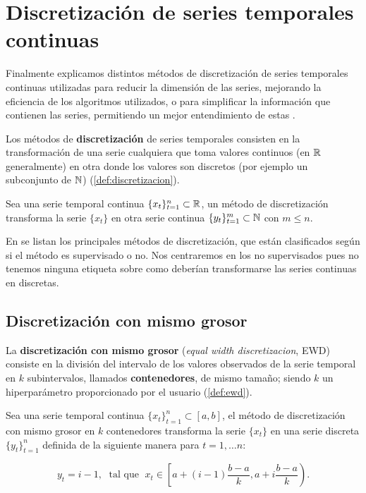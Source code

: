 \section{Discretización de series temporales continuas}

Finalmente explicamos distintos métodos de discretización de series temporales continuas utilizadas para reducir la dimensión de las series, mejorando la eficiencia de los algoritmos utilizados, o para simplificar la información que contienen las series, permitiendo un mejor entendimiento de estas \cite{chaudhari2014discretization}.

Los métodos de \textbf{discretización} de series temporales consisten en la transformación de una serie cualquiera que toma valores continuos (en $\mathbb{R}$ generalmente) en otra donde los valores son discretos (por ejemplo un subconjunto de $\mathbb{N}$) (\autoref{def:discretizacion}).

\begin{definicion}[Discretización]
  Sea una serie temporal continua $\{x_t\}_{t = 1}^n \subset \mathbb{R}$, un método de discretización transforma la serie $\{x_t\}$ en otra serie continua $\{y_t\}_{t = 1}^m \subset \mathbb{N}$ con $m \leq n$.
  \label{def:discretizacion}
\end{definicion}

En \cite{chaudhari2014discretization} se listan los principales métodos de discretización, que están clasificados según si el método es supervisado o no. Nos centraremos en los no supervisados pues no tenemos ninguna etiqueta sobre como deberían transformarse las series continuas en discretas.

\subsection{Discretización con mismo grosor}

La \textbf{discretización con mismo grosor} (\emph{equal width discretizacion}, EWD) consiste en la división del intervalo de los valores observados de la serie temporal en $k$ subintervalos, llamados \textbf{contenedores}, de mismo tamaño; siendo $k$ un hiperparámetro proporcionado por el usuario (\autoref{def:ewd}).

\begin{definicion}
  Sea una serie temporal continua $\{x_t\}_{t = 1}^n \subset [a, b]$, el método de discretización con mismo grosor en $k$ contenedores transforma la serie $\{x_t\}$ en una serie discreta $\{y_t\}_{t = 1}^n$ definida de la siguiente manera para $t = 1, \ldots n$:

  $$y_t = i-1, \; \text{ tal que } \; x_t \in \left[a + (i-1) \dfrac{b - a}{k}, a + i \dfrac{b-a}{k}\right).$$
  \label{def:ewd}
\end{definicion}

